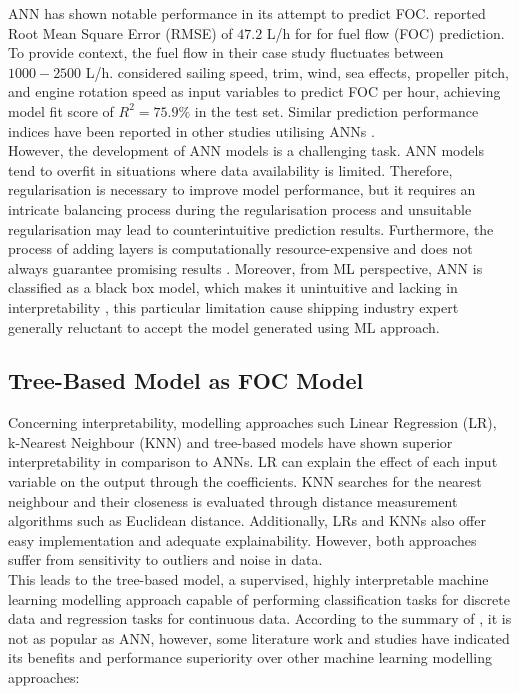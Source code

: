 ANN has shown notable performance in its attempt to predict FOC.  reported Root Mean Square Error (RMSE) of $47.2$ L/h for for fuel flow (FOC) prediction. To provide context, the fuel flow in their case study fluctuates between $1000 - 2500$ L/h.  considered sailing speed, trim, wind, sea effects, propeller pitch, and engine rotation speed as input variables to predict FOC per hour, achieving model fit score of $R^2 = 75.9\%$ in the test set. Similar prediction performance indices have been reported in other studies utilising ANNs .\\

However, the development of ANN models is a challenging task. ANN models tend to overfit in situations where data availability is limited. Therefore, regularisation is necessary to improve model performance, but it requires an intricate balancing process during the regularisation process and unsuitable regularisation may lead to counterintuitive prediction results. Furthermore, the process of adding layers is computationally resource-expensive and does not always guarantee promising results . Moreover, from ML perspective, ANN is classified as a black box model, which makes it unintuitive and lacking in interpretability  , this particular limitation cause shipping industry expert generally reluctant to accept the model generated using ML approach. \\

\subsection{Tree-Based Model as FOC Model}\label{sec:tree_litreview}

Concerning interpretability, modelling approaches such Linear Regression (LR), k-Nearest Neighbour (KNN) and tree-based models have shown superior interpretability in comparison to ANNs. LR can explain the effect of each input variable on the output through the coefficients. KNN searches for the nearest neighbour and their closeness is evaluated through distance measurement algorithms such as Euclidean distance. Additionally, LRs and KNNs also offer easy implementation and adequate explainability. However, both approaches suffer from sensitivity to outliers and noise in data.\\

This leads to the tree-based model, a supervised, highly interpretable machine learning modelling approach capable of performing classification tasks for discrete data and regression tasks for continuous data. According to the summary of , it is not as popular as ANN, however, some literature work and studies have indicated its benefits and performance superiority over other machine learning modelling approaches:\\

